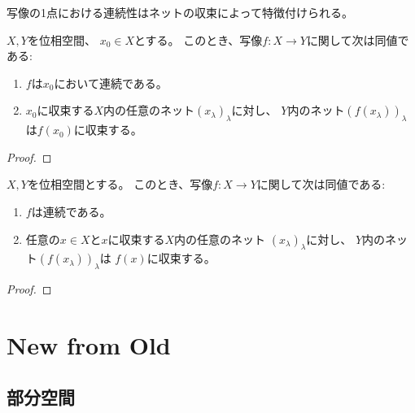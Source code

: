 \documentclass[report]{jlreq}
\begin{document}
写像の1点における連続性はネットの収束によって特徴付けられる。

\begin{theorem}[1点における連続性の特徴付け]
    $X, Y$を位相空間、
    $x_0 \in X$とする。
    このとき、写像$f \colon X \to Y$に関して次は同値である:
    \begin{enumerate}
        \item $f$は$x_0$において連続である。
        \item $x_0$に収束する$X$内の任意のネット$(x_\lambda)_\lambda$に対し、
            $Y$内のネット$(f(x_\lambda))_\lambda$は$f(x_0)$に収束する。
    \end{enumerate}
\end{theorem}

\begin{proof}
    \TODO{}
\end{proof}

\begin{corollary}[連続写像の特徴付け]
    $X, Y$を位相空間とする。
    このとき、写像$f \colon X \to Y$に関して次は同値である:
    \begin{enumerate}
        \item $f$は連続である。
        \item 任意の$x \in X$と$x$に収束する$X$内の任意のネット
            $(x_\lambda)_\lambda$に対し、
            $Y$内のネット$(f(x_\lambda))_\lambda$は
            $f(x)$に収束する。
    \end{enumerate}
\end{corollary}

\begin{proof}
    \TODO{}
\end{proof}



%
\chapter{New from Old}

%
\section{部分空間}
\end{document}
